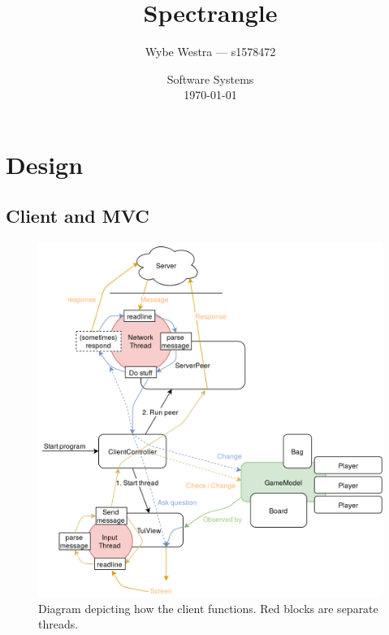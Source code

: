 \documentclass[12pt, letterpaper]{article}
\title{Spectrangle}
\author{Wybe Westra --- s1578472}
\date{Software Systems \\ \today}
\begin{document}
    \maketitle

    \newpage

    \tableofcontents

    \newpage


    \section{Design}



    \subsection{Client and MVC}

    \begin{figure}[ht]
        \begin{center}
            \includegraphics[width=\textwidth]{Client.png}
            \caption{Diagram depicting how the client functions.
            Red blocks are separate threads.}
            \label{fig:clientDiagram}
        \end{center}
    \end{figure}
\end{document}
